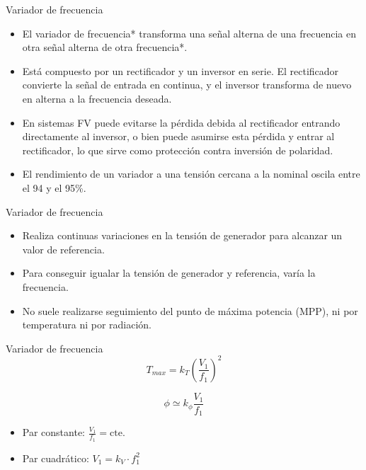 \documentclass[xcolor={usenames,svgnames,dvipsnames}]{beamer}
\begin{document}
\begin{frame}[label=sec-3-0-3]{Variador de frecuencia}
\begin{itemize}
\item El variador de frecuencia* transforma una señal alterna de una
frecuencia en otra señal alterna de otra frecuencia*.

\item Está compuesto por un rectificador y un inversor en serie. El
rectificador convierte la señal de entrada en continua, y el inversor
transforma de nuevo en alterna a la frecuencia deseada.

\item En sistemas FV puede evitarse la pérdida debida al rectificador
entrando directamente al inversor, o bien puede asumirse esta pérdida
y entrar al rectificador, lo que sirve como protección contra
inversión de polaridad.

\item El rendimiento de un variador a una tensión cercana a la nominal
oscila entre el 94 y el 95\%.
\end{itemize}
\end{frame}

\begin{frame}[label=sec-3-0-4]{Variador de frecuencia}
\begin{itemize}
\item Realiza \alert{continuas variaciones en la tensión de generador para
alcanzar un valor de referencia}.

\item Para conseguir igualar la tensión de generador y referencia, varía la
frecuencia.

\item No suele realizarse seguimiento del punto de máxima potencia (MPP),
ni por temperatura ni por radiación.
\end{itemize}
\end{frame}

\begin{frame}[label=sec-3-0-5]{Variador de frecuencia}
$$T_{max}=k_{T}\left(\frac{V_{1}}{f_{1}}\right)^{2}$$

$$\phi\simeq k_{\phi}\frac{V_{1}}{f_{1}}$$

\begin{itemize}
\item Par constante: $\frac{V_{1}}{f_{1}}=\mathrm{cte.}$

\item Par cuadrático: $V_{1}=k_{V}\cdot f_{1}^{2}$
\end{itemize}
\end{frame}
\end{document}
